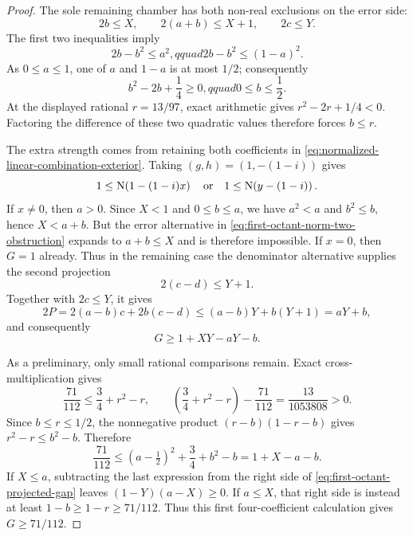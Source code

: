 \documentclass[11pt]{article}
\newcommand{\Norm}[1]{\operatorname{N}\!\left(#1\right)}
\begin{document}
\begin{proof}
The sole remaining chamber has both non-real exclusions on the error side:
\[
             2b\le X,\qquad 2(a+b)\le X+1,
             \qquad 2c\le Y.
\]
The first two inequalities imply
\[
 2b-b^2\le a^2,qquad 2b-b^2\le(1-a)^2.
\]
As $0\le a\le1$, one of $a$ and $1-a$ is at most $1/2$; consequently
\[
 b^2-2b+\frac14\ge0,qquad 0\le b\le\frac12.
\]
At the displayed rational $r=13/97$, exact arithmetic gives
$r^2-2r+1/4<0$.  Factoring the difference of these two quadratic values
therefore forces $b\le r$.

The extra strength comes from retaining both coefficients in
\eqref{eq:normalized-linear-combination-exterior}.  Taking
$(g,h)=(1,-(1-i))$ gives
\begin{equation}
\label{eq:first-octant-norm-two-obstruction}
 1\le\Norm{1-(1-i)x}
 \quad\hbox{or}\quad
 1\le\Norm{y-(1-i)}.
\end{equation}
If $x\ne0$, then $a>0$.  Since $X<1$ and $0\le b\le a$, we have
$a^2<a$ and $b^2\le b$, hence $X<a+b$.  But the error alternative in
\eqref{eq:first-octant-norm-two-obstruction} expands to $a+b\le X$ and is
therefore impossible.  If $x=0$, then $G=1$ already.  Thus in the remaining
case the denominator alternative supplies the second projection
\begin{equation}
\label{eq:first-octant-second-denominator-projection}
                 2(c-d)\le Y+1.
\end{equation}
Together with $2c\le Y$, it gives
\[
 2P=2(a-b)c+2b(c-d)
    \le(a-b)Y+b(Y+1)=aY+b,
\]
and consequently
\begin{equation}
\label{eq:first-octant-projected-gap}
                 G\ge1+XY-aY-b.
\end{equation}

As a preliminary, only small rational comparisons remain.  Exact
cross-multiplication gives
\[
 \frac{71}{112}
 \le\frac34+r^2-r,
 \qquad
 \left(\frac34+r^2-r\right)-\frac{71}{112}
   =\frac{13}{1053808}>0.
\]
Since $b\le r\le1/2$, the nonnegative product
$(r-b)(1-r-b)$ gives $r^2-r\le b^2-b$.  Therefore
\begin{equation}
\label{eq:first-octant-scalar-bound}
 \frac{71}{112}
 \le (a-\tfrac12)^2+\frac34+b^2-b
 =1+X-a-b.
\end{equation}
If $X\le a$, subtracting the last expression from the right side of
\eqref{eq:first-octant-projected-gap} leaves
$(1-Y)(a-X)\ge0$.  If $a\le X$, that right side is instead at least
$1-b\ge1-r\ge71/112$.  Thus this first four-coefficient calculation gives
$G\ge71/112$.


\end{proof}
\end{document}
